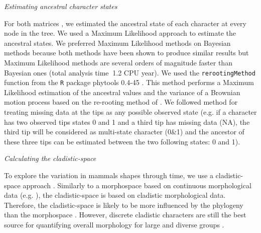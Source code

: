 \documentclass[12pt,letterpaper]{article}
\renewcommand{\subsection}[1]{%
\bigskip
\begin{center}
\begin{large}
\normalfont\itshape #1
\end{large}
\end{center}}
\begin{document}
\subsection{Estimating ancestral character states}
For both matrices \citep{MEE3:MEE312084,beckancient2014}, we estimated the ancestral state of each character at every node in the tree. We used a Maximum Likelihood approach to estimate the ancestral states. We preferred Maximum Likelihood methods on Bayesian methods because both methods have been shown to produce similar results \cite{royer-carenzichoosing2013} but Maximum Likelihood methods are several orders of magnitude faster than Bayesian ones (total analysis time $~$1.2 CPU year). We used the \texttt{rerootingMethod} function from the \texttt{R} package phytools 0.4-45 \citep{phytools}. This method performs a Maximum Likelihood estimation of the ancestral values and the variance of a Brownian motion process based on the re-rooting method of \cite{Yang01121995}. We followed \cite{Claddis} method for treating missing data at the tips as any possible observed state (e.g. if a character has two observed tips states 0 and 1 and a third tip has missing data (NA), the third tip will be considered as multi-state character (0\&1) and the ancestor of these three tips can be estimated between the two following states: 0 and 1).

\subsection{Calculating the cladistic-space}
To explore the variation in mammals shapes through time, we use a cladistic-space approach \cite{Foote01071994,Foote29111996,Wesley-Hunt2005,Brusatte12092008,friedmanexplosive2010,toljagictriassic-jurassic2013}. Similarly to a morphospace based on continuous morphological data (e.g. \cite{finlay2015morphological}), the cladistic-space is based on cladistic morphological data. Therefore, the cladistic-space is likely to be more influenced by the phylogeny than the morphospace \citep{Foote29111996,Wagner01011997}. However, discrete cladistic characters are still the best source for quantifying overall morphology for large and diverse groups \citep{Brusatte12092008}.
\end{document}
